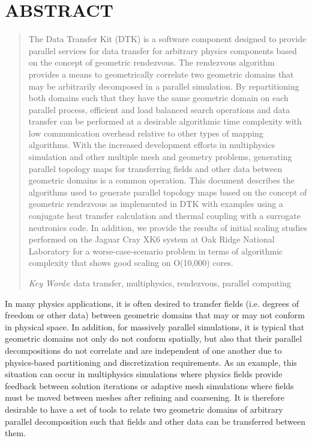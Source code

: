 \documentclass{mc2013}
\begin{document}
\section*{ABSTRACT} 
\begin{quote}
\begin{small}
The Data Transfer Kit (DTK) is a software component designed to
provide parallel services for data transfer for arbitrary physics
components based on the concept of geometric rendezvous. The
rendezvous algorithm provides a means to geometrically correlate two
geometric domains that may be arbitrarily decomposed in a parallel
simulation. By repartitioning both domains such that they have the
same geometric domain on each parallel process, efficient and load
balanced search operations and data transfer can be performed at a
desirable algorithmic time complexity with low communication overhead
relative to other types of mapping algorithms. With the increased
development efforts in multiphysics simulation and other multiple mesh
and geometry problems, generating parallel topology maps for
transferring fields and other data between geometric domains is a
common operation. This document describes the algorithms used to
generate parallel topology maps based on the concept of geometric
rendezvous as implemented in DTK with examples using a conjugate heat
transfer calculation and thermal coupling with a surrogate neutronics
code. In addition, we provide the results of initial scaling studies
performed on the Jaguar Cray XK6 system at Oak Ridge National
Laboratory for a worse-case-scenario problem in terms of algorithmic
complexity that shows good scaling on O(10,000) cores.


\emph{Key Words}: data transfer, multiphysics, rendezvous, parallel
computing
\end{small} 
\end{quote}

\setlength{\baselineskip}{14pt}
\normalsize

\label{sec:intro}

In many physics applications, it is often desired to transfer fields
(i.e. degrees of freedom or other data) between geometric domains that
may or may not conform in physical space. In addition, for massively
parallel simulations, it is typical that geometric domains not only do
not conform spatially, but also that their parallel decompositions do
not correlate and are independent of one another due to physics-based
partitioning and discretization requirements. As an example, this
situation can occur in multiphysics simulations where physics fields
provide feedback between solution iterations or adaptive mesh
simulations where fields must be moved between meshes after refining
and coarsening. It is therefore desirable to have a set of tools to
relate two geometric domains of arbitrary parallel decomposition such
that fields and other data can be transferred between them.
\end{document}
